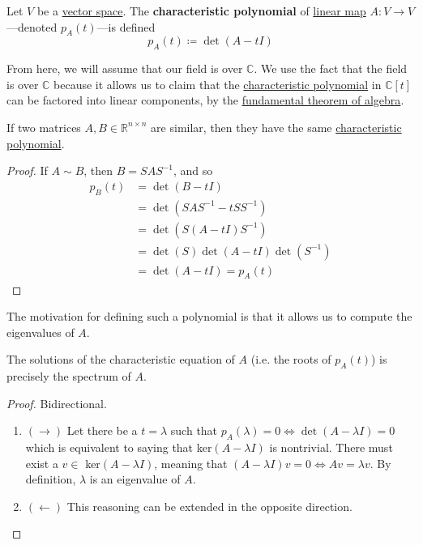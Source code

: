 	\begin{definition}
	  \label{def:characteristic-polynomial}
		Let $V$ be a \hyperref[def:vector-space]{vector space}. The \textbf{characteristic polynomial} of \hyperref[def:linear_map]{linear map} $A: V \to V$---denoted $p_A (t)$---is defined
		\begin{equation}
    	p_A (t) \coloneqq \det{(A - t I)}
		\end{equation}
  \end{definition}

	From here, we will assume that our field is over $\mathbb{C}$. We use the fact that the field is over $\mathbb{C}$ because it allows us to claim that the \hyperref[def:characteristic-polynomial]{characteristic polynomial} in $\mathbb{C}[t]$ can be factored into linear components, by the \hyperref[at-thm:fundamental-theorem-of-algebra]{fundamental theorem of algebra}. 

	\begin{lemma}
	  \label{thm:invariance-of-characteristic-polynomial}
		If two matrices $A, B \in \mathbb{R}^{n \times n}$ are similar, then they have the same \hyperref[def:characteristic-polynomial]{characteristic polynomial}.
	\end{lemma}
	\begin{proof}
		If $A \sim B$, then $B = S A S^{-1}$, and so 
		\begin{align}
			p_B (t) & = \det(B - tI) \\ 
							&= \det(S A S^{-1} - t SS^{-1}) \\ 
							& = \det(S (A - tI) S^{-1}) \\ 
							& = \det(S) \det(A - tI) \det(S^{-1}) \\ 
							& = \det(A - tI) = p_A (t)
		\end{align}
	\end{proof}

  The motivation for defining such a polynomial is that it allows us to compute the eigenvalues of $A$. 

	\begin{theorem}
	  \label{thm:roots-of-characteristic-polynomial-is-the}
    The solutions of the characteristic equation of $A$ (i.e. the roots of $p_A (t)$) is precisely the spectrum of $A$. 
  \end{theorem}
  \begin{proof} 
    Bidirectional. 
    \begin{enumerate}
      \item $(\rightarrow)$ Let there be a $t = \lambda$ such that $p_A (\lambda) = 0 \iff \det{(A - \lambda I)} = 0$ which is equivalent to saying that ker$(A - \lambda I)$ is nontrivial. There must exist a $v \in $ ker$(A - \lambda I)$, meaning that $(A - \lambda I) v = 0 \iff A v = \lambda v$. By definition, $\lambda$ is an eigenvalue of $A$. 
      \item $(\leftarrow)$ This reasoning can be extended in the opposite direction. 
    \end{enumerate}
  \end{proof}

